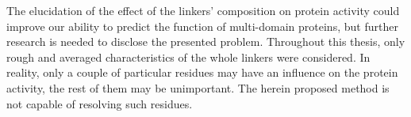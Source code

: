 The elucidation of the effect of the linkers' composition on protein activity could
improve our ability to predict the function of multi-domain proteins, but further
research is needed to disclose the presented problem.
Throughout this thesis, only rough and averaged characteristics of the whole
linkers were considered.
In reality, only a couple of particular residues may have an influence on the protein
activity, the rest of them may be unimportant.
The herein proposed method is not capable of resolving such residues.

